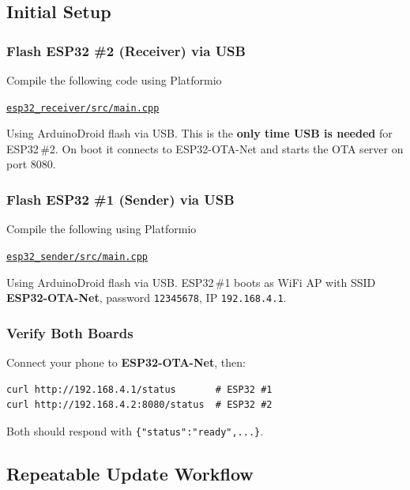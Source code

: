 \documentclass[11pt, a4paper]{article}
\begin{document}
\subsection{Initial Setup}

\subsubsection{Flash ESP32 \#2 (Receiver) via USB}

Compile the following code using Platformio
\begin{notebox}
\href{https://github.com/gajaredarsh/esp-flasher/blob/main/esp_receiver/src/main.cpp}%
{\texttt{esp32\_receiver/src/main.cpp}}
\end{notebox}
Using ArduinoDroid flash via USB. This is the \textbf{only time USB is needed}
for ESP32\,\#2. On boot it connects to ESP32-OTA-Net and starts the OTA server
on port 8080.

\subsubsection{Flash ESP32 \#1 (Sender) via USB}

Compile the following using Platformio
\begin{notebox}
\href{https://github.com/gajaredarsh/esp-flasher/blob/main/esp_sender/src/main.cpp}%
{\texttt{esp32\_sender/src/main.cpp}}
\end{notebox}
Using ArduinoDroid flash via USB. ESP32\,\#1 boots as WiFi AP with SSID \textbf{ESP32-OTA-Net},
password \texttt{12345678}, IP \texttt{192.168.4.1}.

\subsubsection{Verify Both Boards}

Connect your phone to \textbf{ESP32-OTA-Net}, then:

\begin{lstlisting}[caption={Verify both boards}]
curl http://192.168.4.1/status       # ESP32 #1
curl http://192.168.4.2:8080/status  # ESP32 #2
\end{lstlisting}

Both should respond with \texttt{\{"status":"ready",...\}}.

\subsection{Repeatable Update Workflow}
\end{document}

